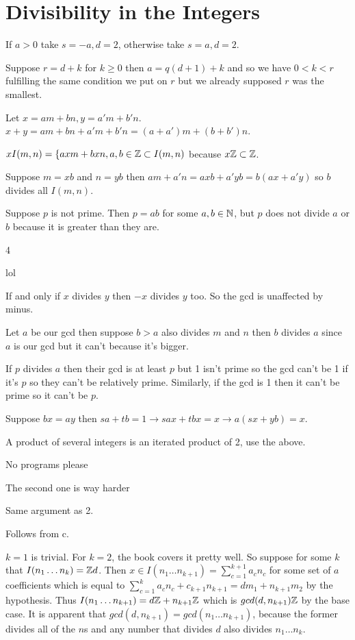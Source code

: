 \documentclass[11pt, oneside]{article}   	%
\begin{document}
\section{Divisibility in the Integers}

\be
\item \be
\item If $a > 0$ take $s=-a, d=2$, otherwise take $s=a, d=2$.
\item Suppose $r = d + k$ for $k \ge 0$ then $a = q(d + 1) + k$ and so we have $0 < k < r$ fulfilling the same condition we put on $r$ but we already supposed $r$ was the smallest.
\ee
\item\be
\item Let $x = am + bn, y = a'm + b'n$. $x + y = am + bn + a'm + b'n = (a + a')m + (b + b')n$.
\item $xI(m,n) = \{axm + bxn, a, b \in \mathbb{Z} \subset I(m, n)$ because $x\mathbb{Z} \subset \mathbb{Z}$.
\item Suppose $m = xb$ and $n = yb$ then $am + a'n = axb + a'yb = b(ax + a'y)$ so $b$ divides all $I(m, n)$.
\ee
\item Suppose $p$ is not prime. Then $p = ab$ for some $a, b \in \mathbb{N}$, but $p$ does not divide $a$ or $b$ because it is greater than they are.
\item \be \item 4 \item lol \ee
\item If and only if $x$ divides $y$ then $-x$ divides $y$ too. So the gcd is unaffected by minus.
\item Let $a$ be our gcd then suppose $b > a$ also divides $m$ and $n$ then $b$ divides $a$ since $a$ is our gcd but it can't because it's bigger.
\item If $p$ divides $a$ then their gcd is at least $p$ but 1 isn't prime so the gcd can't be 1 if it's $p$ so they can't be relatively prime. Similarly, if the gcd is 1 then it can't be prime so it can't be $p$.
\item Suppose $bx = ay$ then $sa + tb = 1 \rightarrow sax + tbx = x \rightarrow a(sx + yb) = x$.
\item A product of several integers is an iterated product of 2, use the above.
\item \be \item No programs please \item The second one is way harder \ee
\item \be \item Same argument as 2. \item Follows from c. \item $k=1$ is trivial. For $k=2$, the book covers it pretty well. So suppose for some $k$ that $I(n_1\ldots n_k) = \mathbb{Z} d$. Then $x \in I(n_1 \ldots n_{k+1}) = \sum_{c=1}^{k+1} a_cn_c$ for some set of $a$ coefficients which is equal to $\sum_{c=1}^ka_cn_c + c_{k+1}n_{k+1} = dm_1 + n_{k+1}m_2$ by the hypothesis. Thus $I(n_1\ldots n_{k+1}) = d\mathbb{Z} + n_{k+1}\mathbb{Z}$ which is $gcd(d, n_{k+1})\mathbb{Z}$ by the base case. It is apparent that $gcd(d, n_{k+1}) = gcd(n_1 \ldots n_{k+1})$, because the former divides all of the $n$s and any number that divides $d$ also divides $n_1 \ldots n_k$.  \ee
\end{document}
